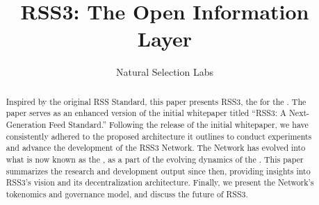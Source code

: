\documentclass[conference]{IEEEtran}
\begin{document}
\title{RSS3: The Open Information Layer}

\author{Natural Selection Labs}
\maketitle

\tableofcontents

\thispagestyle{plain}
\pagestyle{plain}

\begin{abstract}

    Inspired by the original RSS Standard, this paper presents RSS3, the  for the . The paper serves as an enhanced version of the initial whitepaper titled ``RSS3: A Next-Generation Feed Standard.'' Following the release of the initial whitepaper, we have consistently adhered to the proposed architecture it outlines to conduct experiments and advance the development of the RSS3 Network. The Network has evolved into what is now known as the , as a part of the evolving dynamics of the . This paper summarizes the research and development output since then, providing insights into RSS3's vision and its decentralization architecture. Finally, we present the Network's tokenomics and governance model, and discuss the future of RSS3.

\end{abstract}


















\cleardoublepage

\printglossary[title=Glossary, toctitle=Glossary]
\end{document}
